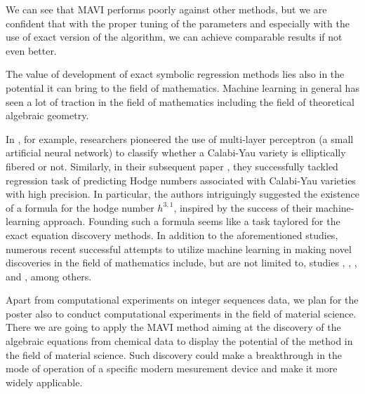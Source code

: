\documentclass[runningheads]{llncs}
\begin{document}
We can see that MAVI performs poorly against other methods, but we are confident that
with the proper tuning of the parameters and especially with the use of
exact version of the algorithm, we can achieve comparable results if not even better.

The value of development of exact symbolic regression methods lies also in 
the potential it can bring to the field of mathematics.
Machine learning in general has seen a lot of traction in the field of mathematics
including the field of theoretical algebraic geometry.

In \cite{Calabi-fibrations}, for example, researchers pioneered the use of multi-layer perceptron (a small artificial neural network) to classify whether a Calabi-Yau variety is elliptically fibered or not.
Similarly, in their subsequent paper \cite{Calabi-4-folds}, they
successfully tackled regression task of predicting Hodge numbers 
associated with Calabi-Yau varieties with high precision.
In particular, the authors intriguingly suggested the existence of a formula for the hodge number $h^{3,1}$, 
inspired by the success of their machine-learning approach.
Founding such a formula seems like a task
taylored for the exact equation discovery methods.
In addition to the aforementioned studies,
numerous recent successful attempts to utilize machine learning in making novel 
discoveries in the field of mathematics include, but are not limited to, studies 
\cite{guided-AI}, \cite{murmurations}, \cite{MLfano}, and \cite{MLsing}, among 
others.  


Apart from computational experiments on integer sequences data, we  plan for 
the poster also to conduct computational experiments in 
the field of material science.
There we are going to apply the 
MAVI method aiming at the discovery of the algebraic equations from chemical data to
display the potential of the method in the field of material science.
Such discovery could make a breakthrough in the mode of operation of a 
specific modern mesurement device and make it more widely applicable.
\end{document}
